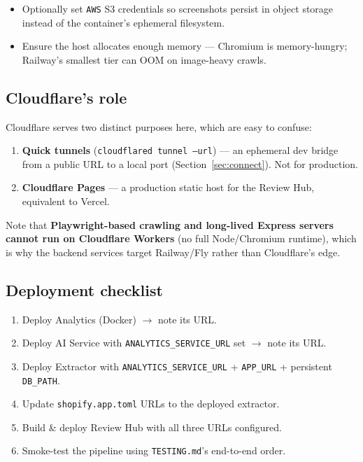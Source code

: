 \documentclass[11pt,a4paper]{article}
\begin{document}
\begin{itemize}[leftmargin=1.4em]
  \item Optionally set \texttt{AWS} S3 credentials so screenshots persist in
  object storage instead of the container's ephemeral filesystem.
  \item Ensure the host allocates enough memory --- Chromium is memory-hungry;
  Railway's smallest tier can OOM on image-heavy crawls.
\end{itemize}

\subsection{Cloudflare's role}

Cloudflare serves two distinct purposes here, which are easy to confuse:

\begin{enumerate}[leftmargin=1.4em]
  \item \textbf{Quick tunnels} (\texttt{cloudflared tunnel --url}) --- an
  ephemeral dev bridge from a public URL to a local port
  (Section~\ref{sec:connect}). Not for production.
  \item \textbf{Cloudflare Pages} --- a production static host for the Review
  Hub, equivalent to Vercel.
\end{enumerate}

Note that \textbf{Playwright-based crawling and long-lived Express servers
cannot run on Cloudflare Workers} (no full Node/Chromium runtime), which is why
the backend services target Railway/Fly rather than Cloudflare's edge.

\subsection{Deployment checklist}

\begin{enumerate}[leftmargin=1.4em]
  \item Deploy Analytics (Docker) $\rightarrow$ note its URL.
  \item Deploy AI Service with \texttt{ANALYTICS\_SERVICE\_URL} set $\rightarrow$ note its URL.
  \item Deploy Extractor with \texttt{ANALYTICS\_SERVICE\_URL} + \texttt{APP\_URL} + persistent \texttt{DB\_PATH}.
  \item Update \texttt{shopify.app.toml} URLs to the deployed extractor.
  \item Build \& deploy Review Hub with all three URLs configured.
  \item Smoke-test the pipeline using \texttt{TESTING.md}'s end-to-end order.
\end{enumerate}
\end{document}
